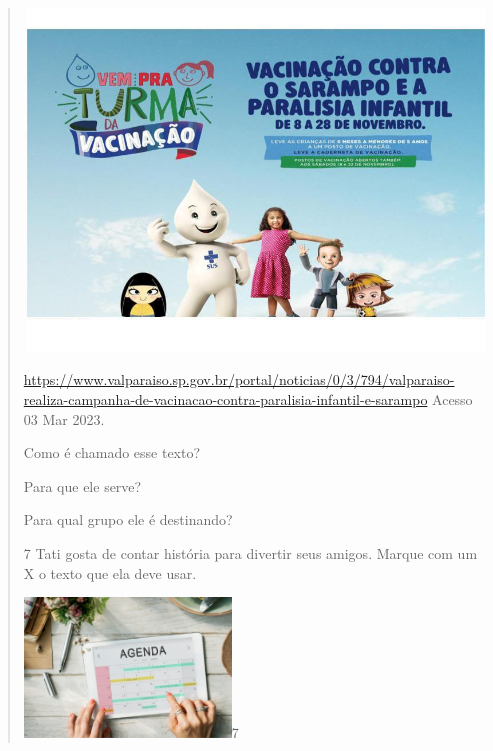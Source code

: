 {{{{\begin{verse}
{{\includegraphics[width=5.14861in,height=3.58125in]{media/image107.jpeg}

\url{https://www.valparaiso.sp.gov.br/portal/noticias/0/3/794/valparaiso-realiza-campanha-de-vacinacao-contra-paralisia-infantil-e-sarampo}
Acesso 03 Mar 2023.

\begin{escolha}
	\item Como é chamado esse texto?


	\item Para que ele serve?


	\item Para qual grupo ele é destinando?


\num{7} Tati gosta de contar história para divertir seus amigos.
Marque com um X o texto que ela deve usar.

{\texorpdfstring{\protect\includegraphics[width=2.16667in,height=1.47014in]{media/image108.jpeg}7
}{7 }}\label{section-48}


\end{escolha}}}
\end{verse}}}}}
